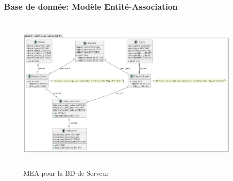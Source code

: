 \subsubsection{Base de donnée: Modèle Entité-Association}
\begin{figure}[H]
	\centering
	\includegraphics[height=8cm]{img/MEA.png} 
	\caption{MEA pour la BD de Serveur}
\end{figure}

